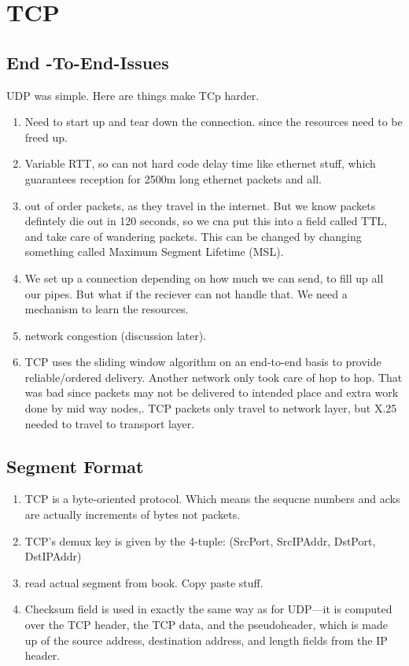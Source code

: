 \documentclass[12pt]{book}
\begin{document}
\section{TCP}
\subsection{End -To-End-Issues}
UDP was simple. Here are things make TCp harder.
\begin{enumerate}
    \item Need to start up and tear down the connection. since the resources need to be freed up.
    \item Variable RTT, so can not hard code delay time like ethernet stuff, which guarantees reception for 2500m long ethernet packets and all.
    \item out of order packets, as they travel in the internet. But we know packets defintely die out in 120 seconds, so we cna put this into a field called TTL, and take care of wandering packets. This can be changed by changing something called Maximum Segment Lifetime (MSL).
    \item We set up a connection depending on how much we can send, to fill up all our pipes. But what if the reciever can not handle that. We need a mechanism to learn the resources.
    \item network congestion (discussion later).
    \item TCP uses the sliding window algorithm on an end-to-end basis to provide reliable/ordered delivery. Another network only took care of hop to hop. That was bad since packets may not be delivered to intended place and extra work done by mid way nodes,. TCP packets only travel to network layer, but X.25 needed to travel to transport layer.
\end{enumerate}

\subsection{Segment Format}
\begin{enumerate}
    \item TCP is a byte-oriented protocol. Which means the sequcne numbers and acks are actually increments of bytes not packets.
    \item TCP’s demux key is given by the 4-tuple: (SrcPort, SrcIPAddr, DstPort, DstIPAddr)
    \item read actual segment from book. Copy paste stuff.
    \item Checksum field is used in exactly the same way as for UDP—it is computed over the TCP header, the TCP data, and the pseudoheader, which is made up of the source address, destination address, and length fields from the IP header.
\end{enumerate}
\end{document}
